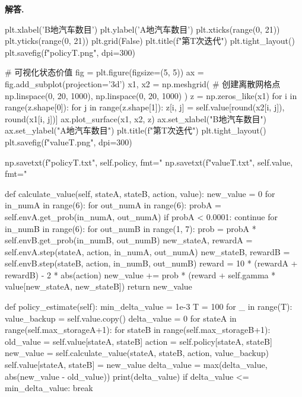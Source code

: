 \documentclass[12pt, a4paper, oneside]{ctexart}
\newenvironment{solution}[1][]{\par\noindent\textbf{#1解答. }}{\smallskip\par}  %
\begin{document}
\begin{solution}
\begin{pythoncode}
        plt.xlabel('B地汽车数目')
        plt.ylabel('A地汽车数目')
        plt.xticks(range(0, 21))
        plt.yticks(range(0, 21))
        plt.grid(False)
        plt.title(f"第{T}次迭代")
        plt.tight_layout()
        plt.savefig(f"policy{T}.png", dpi=300)

        # 可视化状态价值
        fig = plt.figure(figsize=(5, 5))
        ax = fig.add_subplot(projection='3d')
        x1, x2 = np.meshgrid(  # 创建离散网格点
            np.linspace(0, 20, 1000),
            np.linspace(0, 20, 1000)
        )
        z = np.zeros_like(x1)
        for i in range(z.shape[0]):
            for j in range(z.shape[1]):
                z[i, j] = self.value[round(x2[i, j]), round(x1[i, j])]
        ax.plot_surface(x1, x2, z)
        ax.set_xlabel("B地汽车数目")
        ax.set_ylabel("A地汽车数目")
        plt.title(f"第{T}次迭代")
        plt.tight_layout()
        plt.savefig(f"value{T}.png", dpi=300)

        np.savetxt(f"policy{T}.txt", self.policy, fmt="%
        np.savetxt(f"value{T}.txt", self.value, fmt="%

    def calculate_value(self, stateA, stateB, action, value):
        new_value = 0
        for in_numA in range(6):
            for out_numA in range(6):
                probA = self.envA.get_prob(in_numA, out_numA)
                if probA < 0.0001:
                    continue
                for in_numB in range(6):
                    for out_numB in range(1, 7):
                        prob = probA * self.envB.get_prob(in_numB, out_numB)
                        new_stateA, rewardA = self.envA.step(stateA, action, in_numA, out_numA)
                        new_stateB, rewardB = self.envB.step(stateB, action, in_numB, out_numB)
                        reward = 10 * (rewardA + rewardB) - 2 * abs(action)
                        new_value += prob * (reward + self.gamma * value[new_stateA, new_stateB])
        return new_value

    def policy_estimate(self):
        min_delta_value = 1e-3
        T = 100
        for _ in range(T):
            value_backup = self.value.copy()
            delta_value = 0
            for stateA in range(self.max_storageA+1):
                for stateB in range(self.max_storageB+1):
                    old_value = self.value[stateA, stateB]
                    action = self.policy[stateA, stateB]
                    new_value = self.calculate_value(stateA, stateB, action, value_backup)
                    self.value[stateA, stateB] = new_value
                    delta_value = max(delta_value, abs(new_value - old_value))
            print(delta_value)
            if delta_value <= min_delta_value:
                break


\end{pythoncode}
\end{solution}
\end{document}
